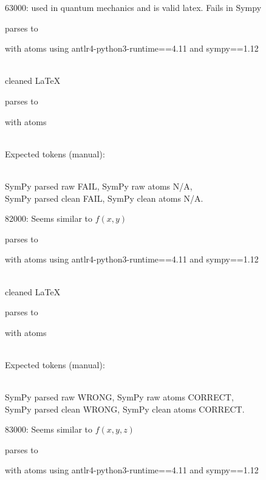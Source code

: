 \documentclass{article}
\begin{document}
\hrulefill

63000: 
used in quantum mechanics and is valid latex. Fails in Sympy

parses to

with atoms
using antlr4-python3-runtime==4.11 and sympy==1.12

\ \\
cleaned \LaTeX

parses to

with atoms


\ \\
Expected tokens (manual):



\ \\
SymPy parsed raw FAIL, 
SymPy raw atoms N/A, \\
SymPy parsed clean FAIL, 
SymPy clean atoms N/A.

\hrulefill

82000:
Seems similar to $f(x, y)$

parses to

with atoms
using antlr4-python3-runtime==4.11 and sympy==1.12

\ \\
cleaned \LaTeX

parses to

with atoms


\ \\
Expected tokens (manual):


\ \\
SymPy parsed raw WRONG, 
SymPy raw atoms CORRECT, \\
SymPy parsed clean WRONG, 
SymPy clean atoms CORRECT.

\hrulefill

83000:
Seems similar to $f(x, y, z)$

parses to

with atoms
using antlr4-python3-runtime==4.11 and sympy==1.12
\end{document}
